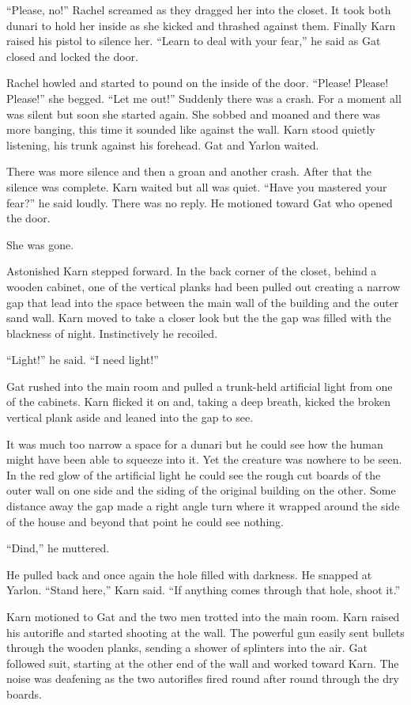 ``Please, no!'' Rachel screamed as they dragged her into the closet. It took both dunari to hold
her inside as she kicked and thrashed against them. Finally Karn raised his pistol to silence
her. ``Learn to deal with your fear,'' he said as Gat closed and locked the door.

Rachel howled and started to pound on the inside of the door. ``Please! Please! Please!'' she
begged. ``Let me out!'' Suddenly there was a crash. For a moment all was silent but soon she
started again. She sobbed and moaned and there was more banging, this time it sounded like
against the wall. Karn stood quietly listening, his trunk against his forehead. Gat and Yarlon
waited.

There was more silence and then a groan and another crash. After that the silence was complete.
Karn waited but all was quiet. ``Have you mastered your fear?'' he said loudly. There was no
reply. He motioned toward Gat who opened the door.

She was gone.

Astonished Karn stepped forward. In the back corner of the closet, behind a wooden cabinet, one
of the vertical planks had been pulled out creating a narrow gap that lead into the space
between the main wall of the building and the outer sand wall. Karn moved to take a closer look
but the the gap was filled with the blackness of night. Instinctively he recoiled.

``Light!'' he said. ``I need light!''

Gat rushed into the main room and pulled a trunk-held artificial light from one of the cabinets.
Karn flicked it on and, taking a deep breath, kicked the broken vertical plank aside and leaned
into the gap to see.

It was much too narrow a space for a dunari but he could see how the human might have been able
to squeeze into it. Yet the creature was nowhere to be seen. In the red glow of the artificial
light he could see the rough cut boards of the outer wall on one side and the siding of the
original building on the other. Some distance away the gap made a right angle turn where it
wrapped around the side of the house and beyond that point he could see nothing.

``Dind,'' he muttered.

He pulled back and once again the hole filled with darkness. He snapped at Yarlon. ``Stand
here,'' Karn said. ``If anything comes through that hole, shoot it.''

Karn motioned to Gat and the two men trotted into the main room. Karn raised his autorifle and
started shooting at the wall. The powerful gun easily sent bullets through the wooden planks,
sending a shower of splinters into the air. Gat followed suit, starting at the other end of the
wall and worked toward Karn. The noise was deafening as the two autorifles fired round after
round through the dry boards.

